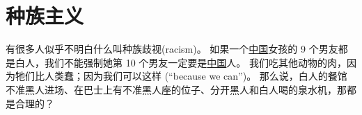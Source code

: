 \documentclass[12pt]{report}
\begin{document}
{%



\chapter{种族主义}

有很多人似乎不明白什么叫种族歧视(racism)。 如果一个\uline{中国}女孩的 9 个男友都是白人，我们不能强制她第 10 个男友一定要是\uline{中国}人。 我们吃其他动物的肉，因为牠们比人类蠢；因为我们可以这样 (``because we can'')。 那么说，白人的餐馆不准黑人进场、在巴士上有不准黑人座的位子、分开黑人和白人喝的泉水机，那都是合理的？

}
\end{document}

